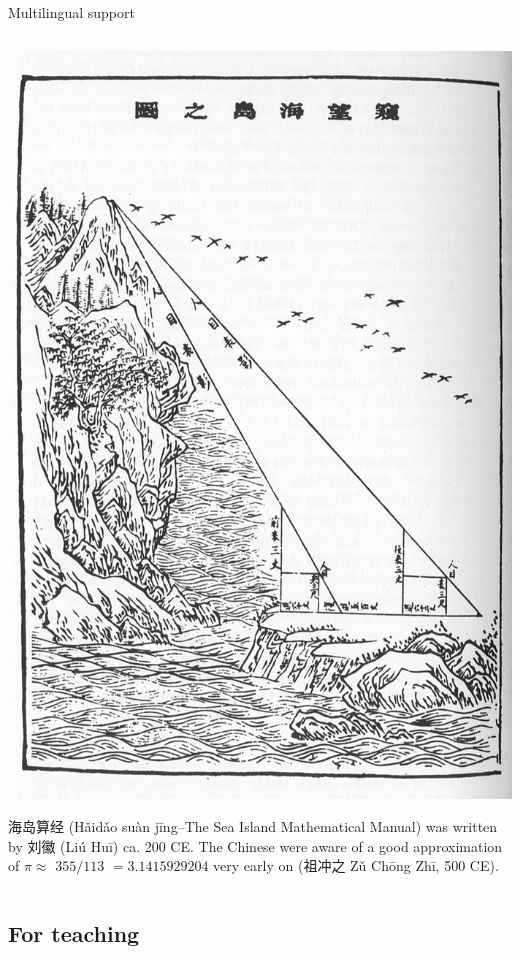 \documentclass[,aspectratio=43]{beamer}
\begin{document}
\begin{frame}{Multilingual support}
\begin{columns}[T]
\begin{column}{0.48\textwidth}
\justifying

\begin{center}\includegraphics[width=1\linewidth,height=0.45\textheight]{figure/00-haidaosuanjing} \end{center}

海岛算经 (Hǎidǎo suàn jīng--The Sea Island Mathematical Manual) was
written by 刘徽 (Liú Huī) ca. 200 CE. The Chinese were aware of a good
approximation of \(\pi\approx\) \(355/113\) \(= 3.1415929204\) very
early on (祖冲之 Zǔ Chōng Zhī, 500 CE).
\end{column}
\end{columns}
\end{frame}

\hypertarget{for-teaching}{%
\subsection{For teaching}\label{for-teaching}}
\end{document}
